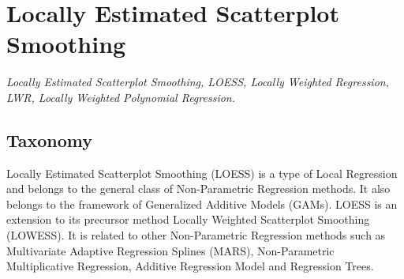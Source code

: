 

\section{Locally Estimated Scatterplot Smoothing} 
\label{sec:loess}

\emph{Locally Estimated Scatterplot Smoothing, LOESS, Locally Weighted Regression, LWR, Locally Weighted Polynomial Regression.}

\subsection{Taxonomy}
Locally Estimated Scatterplot Smoothing (LOESS) is a type of Local Regression and belongs to the general class of Non-Parametric Regression methods. It also belongs to the framework of Generalized Additive Models (GAMs).
LOESS is an extension to its precursor method Locally Weighted Scatterplot Smoothing (LOWESS).
It is related to other Non-Parametric Regression methods such as Multivariate Adaptive Regression Splines (MARS), Non-Parametric Multiplicative Regression, Additive Regression Model and Regression Trees. 

